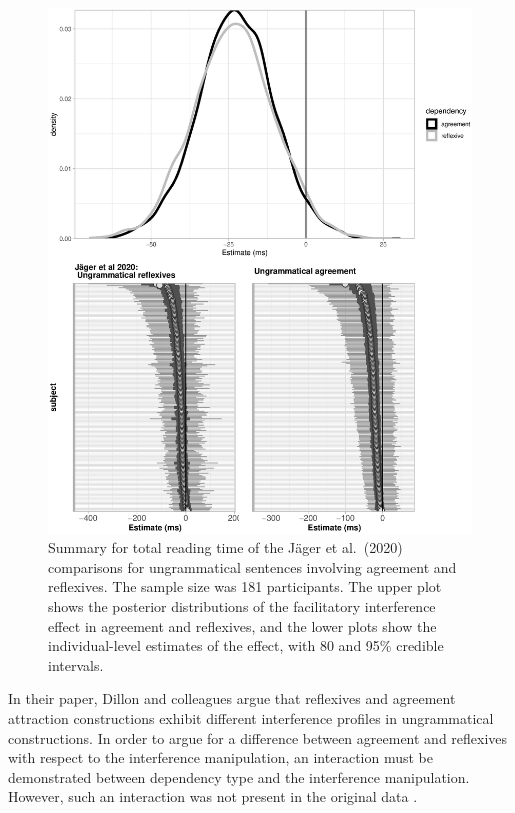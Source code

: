 \documentclass{cambridge7A}\usepackage[]{graphicx}\usepackage[]{color}
\makeatletter
\def\maxwidth{ %
  \ifdim\Gin@nat@width>\linewidth
    \linewidth
  \else
    \Gin@nat@width
  \fi
}
\newenvironment{knitrout}{}{} %
\makeatother
\begin{document}
\begin{figure}[!hbtp]
\centering
\begin{knitrout}
\color{fgcolor}

{\centering \includegraphics[width=\maxwidth]{figures/fig-unnamed-chunk-2-1} 

}



\end{knitrout}
\caption{Summary for total reading time of the J{\"a}ger et al.\ (2020) comparisons for ungrammatical sentences involving agreement and reflexives. The sample size was 181 participants. The upper plot shows the posterior distributions of the facilitatory interference effect in agreement and reflexives, and the lower plots show the individual-level estimates of the effect, with 80 and 95\% credible intervals.}\label{fig:dillonrepresults}
\end{figure}

In their paper, Dillon and colleagues argue that reflexives and agreement attraction constructions exhibit different interference profiles in ungrammatical constructions. In order to argue for a difference between agreement and reflexives with respect to the interference manipulation, an interaction must be demonstrated between dependency type and the interference manipulation. However, such an interaction was not present in the original data \citep{JaegerMertzenVanDykeVasishth2019}.  
\end{document}
